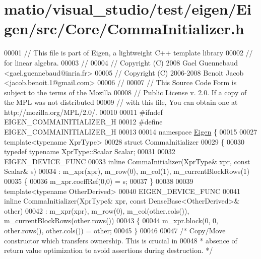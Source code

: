 \hypertarget{matio_2visual__studio_2test_2eigen_2_eigen_2src_2_core_2_comma_initializer_8h_source}{}\section{matio/visual\+\_\+studio/test/eigen/\+Eigen/src/\+Core/\+Comma\+Initializer.h}
\label{matio_2visual__studio_2test_2eigen_2_eigen_2src_2_core_2_comma_initializer_8h_source}

\begin{DoxyCode}
00001 \textcolor{comment}{// This file is part of Eigen, a lightweight C++ template library}
00002 \textcolor{comment}{// for linear algebra.}
00003 \textcolor{comment}{//}
00004 \textcolor{comment}{// Copyright (C) 2008 Gael Guennebaud <gael.guennebaud@inria.fr>}
00005 \textcolor{comment}{// Copyright (C) 2006-2008 Benoit Jacob <jacob.benoit.1@gmail.com>}
00006 \textcolor{comment}{//}
00007 \textcolor{comment}{// This Source Code Form is subject to the terms of the Mozilla}
00008 \textcolor{comment}{// Public License v. 2.0. If a copy of the MPL was not distributed}
00009 \textcolor{comment}{// with this file, You can obtain one at http://mozilla.org/MPL/2.0/.}
00010 
00011 \textcolor{preprocessor}{#ifndef EIGEN\_COMMAINITIALIZER\_H}
00012 \textcolor{preprocessor}{#define EIGEN\_COMMAINITIALIZER\_H}
00013 
00014 \textcolor{keyword}{namespace }\hyperlink{namespace_eigen}{Eigen} \{ 
00015 
00027 \textcolor{keyword}{template}<\textcolor{keyword}{typename} XprType>
00028 \textcolor{keyword}{struct }CommaInitializer
00029 \{
00030   \textcolor{keyword}{typedef} \textcolor{keyword}{typename} XprType::Scalar Scalar;
00031 
00032   EIGEN\_DEVICE\_FUNC
00033   \textcolor{keyword}{inline} CommaInitializer(XprType& xpr, \textcolor{keyword}{const} Scalar& s)
00034     : m\_xpr(xpr), m\_row(0), m\_col(1), m\_currentBlockRows(1)
00035   \{
00036     m\_xpr.coeffRef(0,0) = s;
00037   \}
00038 
00039   \textcolor{keyword}{template}<\textcolor{keyword}{typename} OtherDerived>
00040   EIGEN\_DEVICE\_FUNC
00041   \textcolor{keyword}{inline} CommaInitializer(XprType& xpr, \textcolor{keyword}{const} DenseBase<OtherDerived>& other)
00042     : m\_xpr(xpr), m\_row(0), m\_col(other.cols()), m\_currentBlockRows(other.rows())
00043   \{
00044     m\_xpr.block(0, 0, other.rows(), other.cols()) = other;
00045   \}
00046 
00047   \textcolor{comment}{/* Copy/Move constructor which transfers ownership. This is crucial in }
00048 \textcolor{comment}{   * absence of return value optimization to avoid assertions during destruction. */}

\end{DoxyCode}
